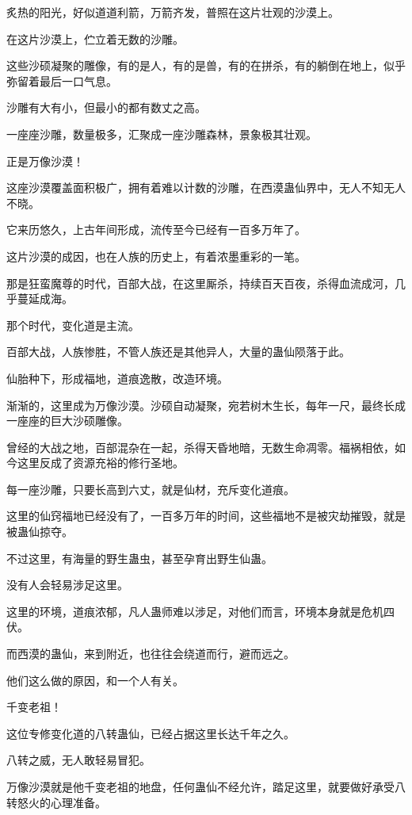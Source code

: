 
\begin{this_body}

炙热的阳光，好似道道利箭，万箭齐发，普照在这片壮观的沙漠上。

在这片沙漠上，伫立着无数的沙雕。

这些沙硕凝聚的雕像，有的是人，有的是兽，有的在拼杀，有的躺倒在地上，似乎弥留着最后一口气息。

沙雕有大有小，但最小的都有数丈之高。

一座座沙雕，数量极多，汇聚成一座沙雕森林，景象极其壮观。

正是万像沙漠！

这座沙漠覆盖面积极广，拥有着难以计数的沙雕，在西漠蛊仙界中，无人不知无人不晓。

它来历悠久，上古年间形成，流传至今已经有一百多万年了。

这片沙漠的成因，也在人族的历史上，有着浓墨重彩的一笔。

那是狂蛮魔尊的时代，百部大战，在这里厮杀，持续百天百夜，杀得血流成河，几乎蔓延成海。

那个时代，变化道是主流。

百部大战，人族惨胜，不管人族还是其他异人，大量的蛊仙陨落于此。

仙胎种下，形成福地，道痕逸散，改造环境。

渐渐的，这里成为万像沙漠。沙硕自动凝聚，宛若树木生长，每年一尺，最终长成一座座的巨大沙硕雕像。

曾经的大战之地，百部混杂在一起，杀得天昏地暗，无数生命凋零。福祸相依，如今这里反成了资源充裕的修行圣地。

每一座沙雕，只要长高到六丈，就是仙材，充斥变化道痕。

这里的仙窍福地已经没有了，一百多万年的时间，这些福地不是被灾劫摧毁，就是被蛊仙掠夺。

不过这里，有海量的野生蛊虫，甚至孕育出野生仙蛊。

没有人会轻易涉足这里。

这里的环境，道痕浓郁，凡人蛊师难以涉足，对他们而言，环境本身就是危机四伏。

而西漠的蛊仙，来到附近，也往往会绕道而行，避而远之。

他们这么做的原因，和一个人有关。

千变老祖！

这位专修变化道的八转蛊仙，已经占据这里长达千年之久。

八转之威，无人敢轻易冒犯。

万像沙漠就是他千变老祖的地盘，任何蛊仙不经允许，踏足这里，就要做好承受八转怒火的心理准备。


\end{this_body}
